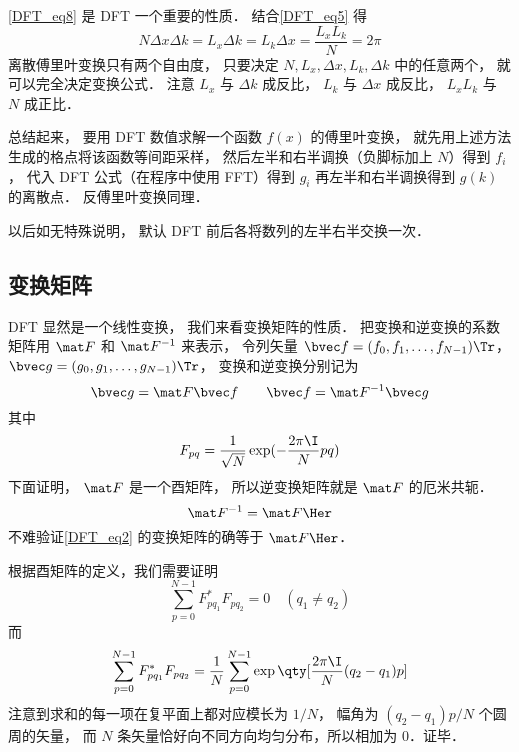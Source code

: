 \autoref{DFT_eq8} 是 DFT 一个重要的性质． 结合\autoref{DFT_eq5} 得
\begin{equation}\label{DFT_eq9}
N\Delta x \Delta k = L_x \Delta k = L_k \Delta x = \frac{L_x L_k}{N} = 2\pi
\end{equation}
离散傅里叶变换只有两个自由度， 只要决定 $N, L_x, \Delta x, L_k, \Delta k$ 中的任意两个， 就可以完全决定变换公式． 注意 $L_x$ 与 $\Delta k$ 成反比， $L_k$ 与 $\Delta x$ 成反比， $L_xL_k$ 与 $N$ 成正比．

总结起来， 要用 DFT 数值求解一个函数 $f(x)$ 的傅里叶变换， 就先用上述方法生成的格点将该函数等间距采样， 然后左半和右半调换（负脚标加上 $N$）得到 $f_i$， 代入 DFT 公式（在程序中使用 FFT）得到 $g_i$ 再左半和右半调换得到 $g(k)$ 的离散点． 反傅里叶变换同理．

以后如无特殊说明， 默认 DFT 前后各将数列的左半右半交换一次．

\subsection{变换矩阵}
DFT 显然是一个线性变换， 我们来看变换矩阵的性质． 把变换和逆变换的系数矩阵用
 $\mat F$ 和 $\mat F^{-1}$ 来表示， 令列矢量 $\bvec f = (f_0,f_1,\dots,f_{N-1})\Tr$， $\bvec g = (g_0,g_1,\dots,g_{N-1})\Tr$， 变换和逆变换分别记为
\begin{equation}
\bvec g = \mat F \bvec f \qquad
\bvec f = \mat F^{-1} \bvec g
\end{equation}
其中
\begin{equation}
F_{pq} = \frac{1}{\sqrt{N}} \exp(-\frac{2\pi\I}{N} p q)
\end{equation}
下面证明， $\mat F$ 是一个酉矩阵， 所以逆变换矩阵就是 $\mat F$ 的厄米共轭．
\begin{equation}
\mat F^{-1} = \mat F\Her
\end{equation}
不难验证\autoref{DFT_eq2} 的变换矩阵的确等于 $\mat F\Her$．

根据酉矩阵的定义，我们需要证明
\begin{equation}
\sum_{p=0}^{N-1} F^*_{pq_1} F_{pq_2} = 0 \quad (q_1 \ne q_2)
\end{equation}
而
\begin{equation}\label{DFT_eq14}
\sum_{p=0}^{N-1} F^*_{pq_1}F_{pq_2}
= \frac1N \sum_{p=0}^{N-1} \exp\qty[\frac{2\pi\I}{N} (q_2-q_1) p]
\end{equation}
注意到求和的每一项在复平面上都对应模长为 $1/N$， 幅角为 $(q_2-q_1)p/N$ 个圆周的矢量，
而 $N$ 条矢量恰好向不同方向均匀分布，所以相加为 $0$．证毕．

